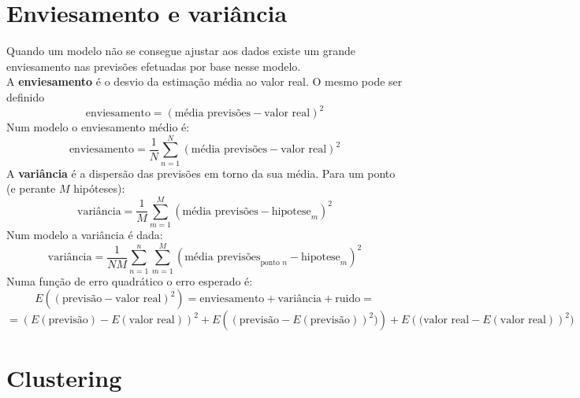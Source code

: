 \documentclass[]{report}
\begin{document}
\chapter{Enviesamento e variância}
Quando um modelo não se consegue ajustar aos dados existe um grande enviesamento nas previsões efetuadas por base nesse modelo.\\
A \textbf{enviesamento} é o desvio da estimação média ao valor real. O mesmo pode ser definido
$$\text{enviesamento} = (\text{média previsões} - \text{valor real})^2$$
Num modelo o enviesamento médio é:
$$\text{enviesamento} = \frac{1}{N}\sum_{n=1}^N(\text{média previsões} - \text{valor real})^2$$
A \textbf{variância} é a dispersão das previsões em torno da sua média. Para um ponto (e perante $M$ hipóteses):
$$\text{variância} = \frac{1}{M}\sum_{m=1}^M (\text{média previsões} - \text{hipotese}_m)^2$$
Num modelo a variância é dada:
$$\text{variância} = \frac{1}{NM}\sum_{n=1}^n \sum_{m=1}^M (\text{média previsões}_{\text{ponto }n} - \text{hipotese}_m)^2$$
Numa função de erro quadrático o erro esperado é:
$$E((\text{previsão} - \text{valor real})^2) =\text{enviesamento} + \text{variância} + \text{ruido} =$$
$$= \left(E(\text{previsão}) - E(\text{valor real})\right)^2 +
E\left((\text{previsão}-E(\text{previsão}))^2)\right) +
E\left((\text{valor real}-E(\text{valor real})\right)^2)$$
\chapter{Clustering}
\end{document}
